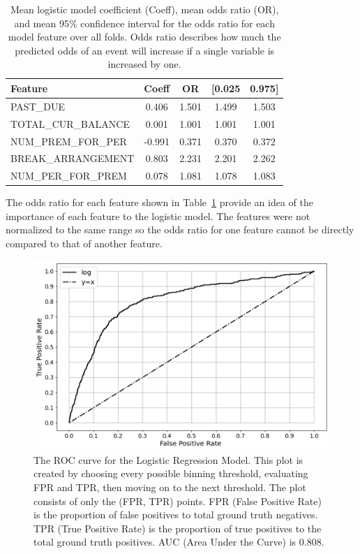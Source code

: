 \documentclass[10pt,letterpaper]{article}
\newcommand{\red}[1]{{\color{red}{#1}}}
\begin{document}
\begin{table}[!h]
    \begin{tabular}{lcccc}
    \toprule
    Feature &                   Coeff &       OR &       [0.025 &       0.975] \\
    \midrule
    PAST\_DUE &                  0.406 &    1.501 &        1.499 &        1.503 \\
    TOTAL\_CUR\_BALANCE  &       0.001 &    1.001 &        1.001 &        1.001 \\
    NUM\_PREM\_FOR\_PER  &      -0.991 &    0.371 &        0.370 &        0.372 \\
    BREAK\_ARRANGEMENT   &       0.803 &    2.231 &        2.201 &        2.262 \\
    NUM\_PER\_FOR\_PREM  &       0.078 &    1.081 &        1.078 &        1.083 \\
    \bottomrule
    \end{tabular}
    \caption{Mean logistic model coefficient (Coeff), mean odds ratio (OR), and mean 95\% confidence interval for the odds ratio for each model feature over all folds. Odds ratio describes how much the predicted odds of an event will increase if a single variable is increased by one.}
    \label{tbl:meanParams}
\end{table}

The odds ratio for each feature shown in Table~\ref{tbl:meanParams} provide an idea of the importance of each feature to the logistic model. The features were not normalized to the same range so the odds ratio for one feature cannot be directly compared to that of another feature.

\begin{figure}[htb]
    \centering
    \includegraphics[width=\textwidth]{../img/ROC.png}
    \caption[ROC curve]{The ROC curve for the Logistic Regression Model. This plot is created by choosing every possible binning threshold, evaluating FPR and TPR, then moving on to the next threshold. The plot consists of only the (FPR, TPR) points. FPR (False Positive Rate) is the proportion of false positives to total ground truth negatives. TPR (True Positive Rate) is the proportion of true positives to the total ground truth positives. AUC (Area Under the Curve) is 0.808. \red{REMOVE GRAPHICS BEFORE SUBMISSION}}
    \label{fig:ROC}
\end{figure}
\end{document}
